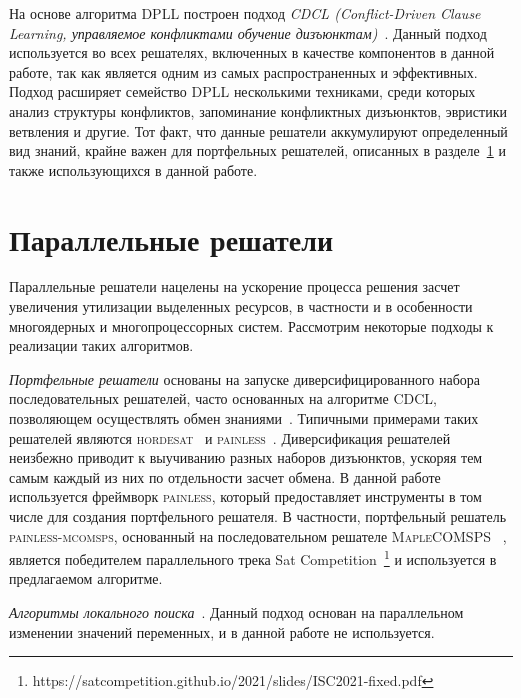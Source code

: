 На основе алгоритма DPLL построен подход \textit{CDCL (Conflict-Driven Clause Learning, управляемое
конфликтами обучение дизъюнктам)}~\cite{bib:cdcl}. Данный подход используется во всех решателях, 
включенных в качестве компонентов в данной работе, так как является одним из самых распространенных и
эффективных. Подход расширяет семейство DPLL несколькими техниками, среди которых анализ структуры
конфликтов, запоминание конфликтных дизъюнктов, эвристики ветвления и другие. Тот факт, что
данные решатели аккумулируют определенный вид знаний, крайне важен для портфельных решателей,
описанных в разделе~\ref{overview:parallel} и также использующихся в данной работе.

\section{Параллельные решатели}\label{overview:parallel}

Параллельные решатели нацелены на ускорение процесса решения засчет увеличения утилизации
выделенных ресурсов, в частности и в особенности многоядерных и многопроцессорных систем. Рассмотрим
некоторые подходы к реализации таких алгоритмов.

\textit{Портфельные решатели} основаны на запуске диверсифицированного набора последовательных
решателей, часто основанных на алгоритме CDCL, позволяющем осуществлять обмен 
знаниями~\cite{bib:painless-sharing}. Типичными примерами таких решателей являются 
\textsc{hordesat}~\cite{bib:hordesat-portfolio} и \textsc{painless}~\cite{bib:painless}. 
Диверсификация решателей неизбежно приводит к выучиванию разных наборов дизъюнктов, ускоряя тем самым 
каждый из них по отдельности засчет обмена. В данной работе используется фреймворк 
\textsc{painless}, который предоставляет инструменты
в том числе для создания портфельного решателя. В частности, портфельный решатель 
\textsc{painless-mcomsps}, основанный на последовательном решателе \textsc{MapleCOMSPS}
~\cite{bib:maplecomsps}, является победителем параллельного 
трека Sat Competition~\footnote{https://satcompetition.github.io/2021/slides/ISC2021-fixed.pdf} и 
используется в предлагаемом алгоритме.

\textit{Алгоритмы локального поиска}~\cite{bib:local-search}. Данный подход основан на параллельном
изменении значений переменных, и в данной работе не используется.

